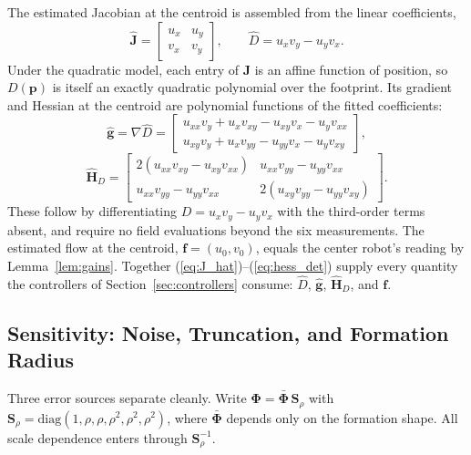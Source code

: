 \documentclass[lettersize,journal]{IEEEtran}
\begin{document}
The estimated Jacobian at the centroid is assembled from the linear
coefficients,
\begin{equation}
    \hat{\mathbf{J}} =
    \begin{bmatrix} u_x & u_y \\ v_x & v_y \end{bmatrix},
    \qquad
    \hat{D} = u_x v_y - u_y v_x.
    \label{eq:J_hat}
\end{equation}
Under the quadratic model, each entry of $\mathbf{J}$ is an affine
function of position, so $D(\mathbf{p})$ is itself an exactly quadratic
polynomial over the footprint. Its gradient and Hessian at the centroid
are polynomial functions of the fitted coefficients:
\begin{equation}
    \hat{\mathbf{g}} = \nabla \hat{D} =
    \begin{bmatrix}
        u_{xx} v_y + u_x v_{xy} - u_{xy} v_x - u_y v_{xx} \\
        u_{xy} v_y + u_x v_{yy} - u_{yy} v_x - u_y v_{xy}
    \end{bmatrix},
    \label{eq:grad_det}
\end{equation}
\begin{equation}
    \hat{\mathbf{H}}_D =
    \begin{bmatrix}
        2(u_{xx} v_{xy} - u_{xy} v_{xx}) &
        u_{xx} v_{yy} - u_{yy} v_{xx} \\
        u_{xx} v_{yy} - u_{yy} v_{xx} &
        2(u_{xy} v_{yy} - u_{yy} v_{xy})
    \end{bmatrix}.
    \label{eq:hess_det}
\end{equation}
These follow by differentiating $D = u_x v_y - u_y v_x$ with the
third-order terms absent, and require no field evaluations beyond the six
measurements. The estimated flow at the centroid,
$\mathbf{f} = (u_0, v_0)$, equals the center robot's reading by
Lemma~\ref{lem:gains}. Together
(\ref{eq:J_hat})--(\ref{eq:hess_det}) supply every quantity the
controllers of Section~\ref{sec:controllers} consume: $\hat{D}$,
$\hat{\mathbf{g}}$, $\hat{\mathbf{H}}_D$, and $\mathbf{f}$.

\subsection{Sensitivity: Noise, Truncation, and Formation Radius}
\label{sec:sensitivity}

Three error sources separate cleanly. Write $\boldsymbol{\Phi} =
\bar{\boldsymbol{\Phi}}\,\mathbf{S}_\rho$ with $\mathbf{S}_\rho =
\mathrm{diag}(1, \rho, \rho, \rho^2, \rho^2, \rho^2)$, where
$\bar{\boldsymbol{\Phi}}$ depends only on the formation shape. All
scale dependence enters through $\mathbf{S}_\rho^{-1}$.
\end{document}
